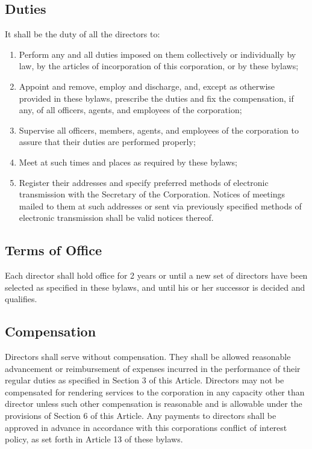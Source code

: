 \documentclass{article}
\begin{document}
	\subsection{Duties}
	It shall be the duty of all the directors to:
	\begin{enumerate}[\indent (a)]
		\item Perform any and all duties imposed on them collectively or individually by law, by the articles of incorporation of this corporation, or by these bylaws;
		\item Appoint and remove, employ and discharge, and, except as otherwise provided in these bylaws, prescribe the duties and fix the compensation, if any, of all officers, agents, and employees of the corporation;
		\item Supervise all officers, members, agents, and employees of the corporation to assure that their duties are performed properly;
		\item Meet at such times and places as required by these bylaws;
		\item Register their addresses and specify preferred methods of electronic transmission with the Secretary of the Corporation. Notices of meetings mailed to them at such addresses or sent via previously specified methods of electronic transmission shall be valid notices thereof.
	\end{enumerate}
	
	\subsection{Terms of Office}
	Each director shall hold office for 2 years or until a new set of directors have been selected as specified in these bylaws, and until his or her successor is decided and qualifies.
	\subsection{Compensation}
	Directors shall serve without compensation. They shall be allowed reasonable advancement or reimbursement of expenses incurred in the performance of their regular duties as specified in Section 3 of this Article. Directors may not be compensated for rendering services to the corporation in any capacity other than director unless such other compensation is reasonable and is allowable under the provisions of Section 6 of this Article. Any payments to directors shall be approved in advance in accordance with this corporation\textquotesingle s conflict of interest policy, as set forth in Article 13 of these bylaws.
\end{document}
